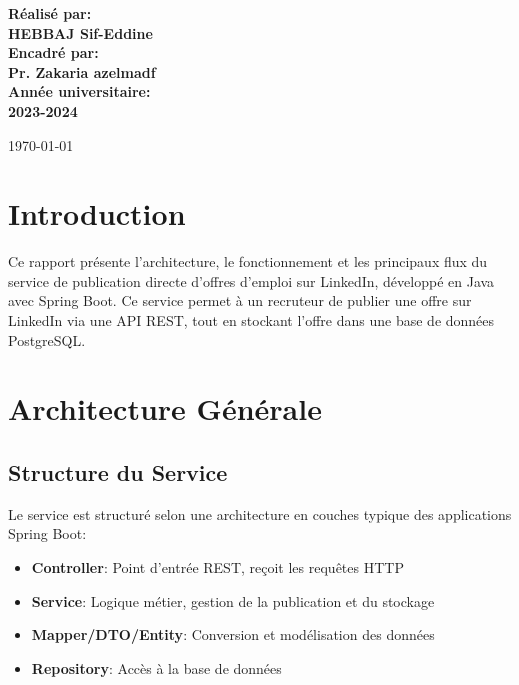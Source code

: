 \documentclass[a4paper,12pt]{report}
\begin{document}
\begin{titlepage}
\begin{center}
        \begin{minipage}{0.8\textwidth}
            \centering
            \large
            \textbf{Réalisé par:} \\
            \vspace{0.3cm}
            \textbf{HEBBAJ Sif-Eddine} \\
            \vspace{1cm}
            \textbf{Encadré par:} \\
            \vspace{0.3cm}
            \textbf{Pr. Zakaria azelmadf} \\
            \vspace{1cm}
            \textbf{Année universitaire:} \\
            \vspace{0.3cm}
            \textbf{2023-2024}
        \end{minipage}
        
        \vfill
        
        {\large \today}
    \end{center}
\end{titlepage}

\tableofcontents
\clearpage

\chapter*{Introduction}
\thispagestyle{plain}
Ce rapport présente l'architecture, le fonctionnement et les principaux flux du service de publication directe d'offres d'emploi sur LinkedIn, développé en Java avec Spring Boot. Ce service permet à un recruteur de publier une offre sur LinkedIn via une API REST, tout en stockant l'offre dans une base de données PostgreSQL.

\chapter{Architecture Générale}
\section{Structure du Service}
Le service est structuré selon une architecture en couches typique des applications Spring Boot:

\begin{itemize}[leftmargin=*]
    \item \textbf{Controller}: Point d'entrée REST, reçoit les requêtes HTTP
    \item \textbf{Service}: Logique métier, gestion de la publication et du stockage
    \item \textbf{Mapper/DTO/Entity}: Conversion et modélisation des données
    \item \textbf{Repository}: Accès à la base de données
\end{itemize}
\end{document}
